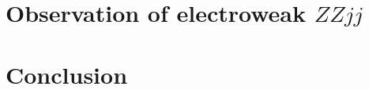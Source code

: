\documentclass{PoS}
\begin{document}
\section{Observation of electroweak $ZZjj$}
\label{sec:ewk}


\section{Conclusion}
\label{sec:conclusion}




\end{document}

